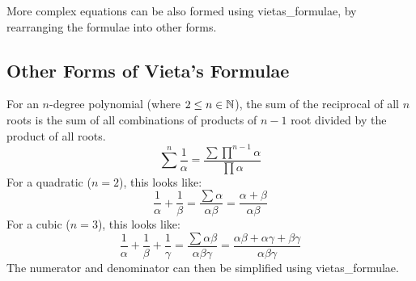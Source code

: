         More complex equations can be also formed using \gls{vietas_formulae}, by rearranging the formulae into other forms.

    \subsection{Other Forms of Vieta's Formulae}
        \begin{theorem}
            For an $n$-degree \gls{polynomial} (where $2\le n\in\operatorname{\mathbb{N}}$), the sum of the \gls{reciprocal} of all $n$ \glspl{root} is the sum of all combinations of products of $n-1$ \gls{root} divided by the product of all \glspl{root}.
            \begin{equation}
                \sum^n\frac{1}{\alpha}=\frac{\sum\prod^{n-1}\alpha}{\prod\alpha}
            \end{equation}
            For a \gls{quadratic} ($n=2$), this looks like:
            \begin{equation}
                \frac{1}{\alpha}+\frac{1}{\beta}=\frac{\sum\alpha}{\alpha\beta}=\frac{\alpha+\beta}{\alpha\beta}
            \end{equation}
            For a \gls{cubic} ($n=3$), this looks like:
            \begin{equation}
                \frac{1}{\alpha}+\frac{1}{\beta}+\frac{1}{\gamma}=\frac{\sum\alpha\beta}{\alpha\beta\gamma}=\frac{\alpha\beta+\alpha\gamma+\beta\gamma}{\alpha\beta\gamma}
            \end{equation}
            The numerator and denominator can then be simplified using \gls{vietas_formulae}.
        \end{theorem}
